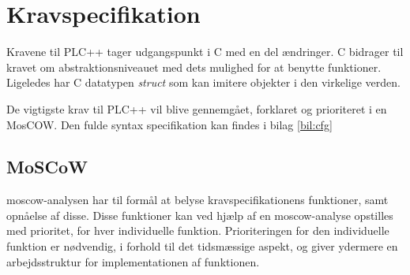 \section{Kravspecifikation}
Kravene til PLC++ tager udgangspunkt i C med en del ændringer. C bidrager til kravet om abstraktionsniveauet med dets mulighed for at benytte funktioner. Ligeledes har C datatypen \textit{struct} som kan imitere objekter i den virkelige verden.

De vigtigste krav til PLC++ vil blive gennemgået, forklaret og prioriteret i en MosCOW. Den fulde syntax specifikation kan findes i bilag \ref{bil:cfg}

\subsection{MoSCoW}
\gls{moscow}-analysen har til formål at belyse kravspecifikationens funktioner, samt opnåelse af disse.
Disse funktioner kan ved hjælp af en \gls{moscow}-analyse opstilles med prioritet, for hver individuelle funktion.
Prioriteringen for den individuelle funktion er nødvendig, i forhold til det tidsmæssige aspekt, og giver ydermere en arbejdsstruktur for implementationen af funktionen.

